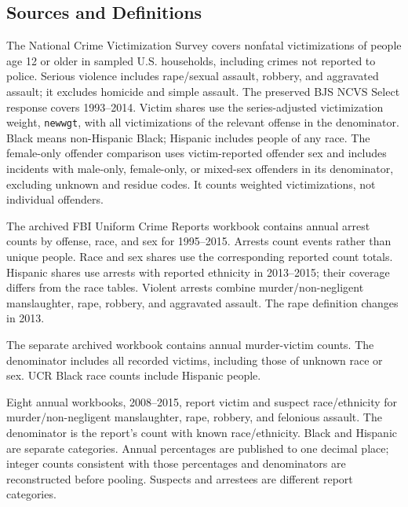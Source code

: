 \subsection*{Sources and Definitions}
\begin{description}\raggedright
\item[NCVS.] The National Crime Victimization Survey covers nonfatal victimizations of people age 12 or older in sampled U.S. households, including crimes not reported to police. Serious violence includes rape/sexual assault, robbery, and aggravated assault; it excludes homicide and simple assault. The preserved BJS NCVS Select response covers 1993--2014. Victim shares use the series-adjusted victimization weight, \texttt{newwgt}, with all victimizations of the relevant offense in the denominator. Black means non-Hispanic Black; Hispanic includes people of any race. The female-only offender comparison uses victim-reported offender sex and includes incidents with male-only, female-only, or mixed-sex offenders in its denominator, excluding unknown and residue codes. It counts weighted victimizations, not individual offenders.

\item[UCR arrests.] The archived FBI Uniform Crime Reports workbook contains annual arrest counts by offense, race, and sex for 1995--2015. Arrests count events rather than unique people. Race and sex shares use the corresponding reported count totals. Hispanic shares use arrests with reported ethnicity in 2013--2015; their coverage differs from the race tables. Violent arrests combine murder/non-negligent manslaughter, rape, robbery, and aggravated assault. The rape definition changes in 2013.

\item[UCR homicide victims.] The separate archived workbook contains annual murder-victim counts. The denominator includes all recorded victims, including those of unknown race or sex. UCR Black race counts include Hispanic people.

\item[NYPD enforcement.] Eight annual workbooks, 2008--2015, report victim and suspect race/ethnicity for murder/non-negligent manslaughter, rape, robbery, and felonious assault. The denominator is the report's count with known race/ethnicity. Black and Hispanic are separate categories. Annual percentages are published to one decimal place; integer counts consistent with those percentages and denominators are reconstructed before pooling. Suspects and arrestees are different report categories.


\end{description}

